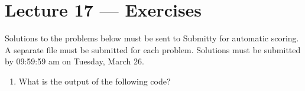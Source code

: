 \documentclass[letterpaper,10pt,english]{sphinxmanual}
\begin{document}
\chapter{Lecture 17 — Exercises}
\label{\detokenize{lecture_notes/lec17_dictionaries2_exercises/exercises:lecture-17-exercises}}\label{\detokenize{lecture_notes/lec17_dictionaries2_exercises/exercises::doc}}
Solutions to the problems below must be sent to Submitty for
automatic scoring. A separate file must be submitted for each problem.
Solutions must be submitted by 09:59:59 am on Tuesday, March 26.
\begin{enumerate}
\def\theenumi{\arabic{enumi}}
\def\labelenumi{\theenumi .}
\makeatletter\def\p@enumii{\p@enumi \theenumi .}\makeatother
\item {} 
What is the output of the following code?

\begin{sphinxVerbatim}[commandchars=\\\{\}]
  
  \PYG{p}{[}  \PYG{p}{]}
\PYG{p}{[}\PYG{p}{]}  
\PYG{p}{[}\PYG{p}{]}  
\PYG{p}{[} \PYG{p}{]}
\PYG{p}{[}\PYG{p}{]}  \PYG{p}{[}\PYG{p}{]}
\PYG{p}{[}\PYG{p}{]}
\PYG{p}{[}\PYG{p}{]}
 
   
     \PYG{p}{[}\PYG{p}{]}
\end{sphinxVerbatim}


\end{enumerate}
\end{document}
